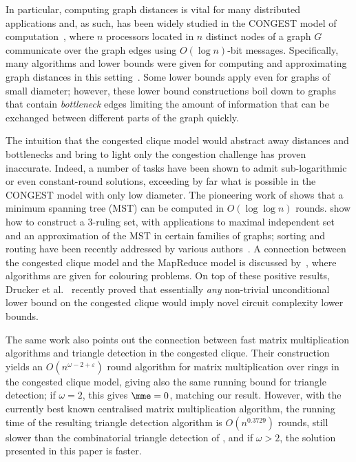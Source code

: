 In particular, computing graph distances is vital for many distributed applications and, as such, has been widely studied in the CONGEST model of computation~\cite{peleg00}, where $n$ processors located in $n$ distinct nodes of a graph $G$ communicate over the graph edges using $O(\log{n})$-bit messages. Specifically, many algorithms and lower bounds were given for computing and approximating graph distances
in this setting~\cite{DHKNPPW-11, nanongkai14, LP13:podc,HolzerW12, PelegRT12,FHW-12,LenzenP13_routing_tables,holzer14,KP98,PelegR-00}. Some lower bounds apply even for graphs of small diameter; however, these lower bound constructions boil down to graphs that contain \emph{bottleneck} edges limiting the amount of information that can be exchanged between different parts of the graph quickly.

The intuition that the congested clique model would abstract away distances and bottlenecks and bring to light only the congestion challenge has proven inaccurate.
Indeed, a number of tasks have been shown to admit sub-logarithmic or even constant-round solutions, exceeding by far what is possible in the CONGEST model with only low diameter. The pioneering work of \citet{lotker05} shows that a minimum spanning tree (MST) can be computed in $O(\log \log n)$ rounds. \citet{hegeman14} show how to construct a $3$-ruling set, with applications to maximal independent set and an approximation of the MST in certain families of graphs; sorting and routing have been recently addressed by various authors~\cite{lenzen2013optimal,LenzenW11,patt-shamir11}. A connection between the congested clique model and the MapReduce model is discussed by~\citet{HegemanP14}, where algorithms are given for colouring problems. On top of these positive results, Drucker et al.~\cite{drucker13} recently proved that essentially \emph{any} non-trivial unconditional lower bound on the congested clique would imply novel circuit complexity lower bounds.

The same work also points out the connection between fast matrix multiplication algorithms and triangle detection in the congested clique. Their construction yields an $O(n^{\omega -2+\varepsilon})$ round algorithm for matrix multiplication over rings in the congested clique model, giving also the same running bound for triangle detection; if $\omega = 2$, this gives $\mme = 0$, matching our result. However, with the currently best known centralised matrix multiplication algorithm, the running time of the resulting triangle detection algorithm is $O(n^{0.3729})$ rounds, still slower than the combinatorial triangle detection of \citet{tritri}, and if $\omega>2$, the solution presented in this paper is faster.


